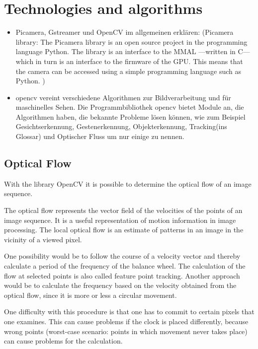 \documentclass[12pt, a4paper]{report}
\begin{document}
    \chapter{Technologies and algorithms}
    \begin{itemize}
        \item Picamera, Gstreamer und OpenCV im allgemeinen erklären:
        (Picamera library: The Picamera library is an open source project in the programming language Python. The library is an interface to the MMAL ---written in C--- which in turn is an interface to the firmware of the GPU.
    This means that the camera can be accessed using a simple programming language such as Python.  \cite{ReadTheDocsPicamera})    
        \item opencv vereint verschiedene Algorithmen zur Bildverarbeitung und für maschinelles Sehen. Die Programmbibliothek opencv bietet Module an, die Algorithmen haben, die bekannte Probleme lösen können, wie zum Beispiel Gesichtserkennung, Gestenerkennung, Objekterkennung, Tracking(ins Glossar) und Optischer Fluss um nur einige zu nennen.
  \end{itemize}
    
    \section{Optical Flow}
    With the library OpenCV it is possible to determine the optical flow of an image sequence. 
    
    The optical flow represents the vector field of the velocities of the points of an image sequence. It is a useful representation of motion information in image processing. The local optical flow is an estimate of patterns in an image in the vicinity of a viewed pixel. 
    
    One possibility would be to follow the course of a velocity vector and thereby calculate a period of the frequency of the balance wheel. The calculation of the flow at selected points is also called feature point tracking. Another approach would be to calculate the frequency based on the velocity obtained from the optical flow, since it is more or less a circular movement. 
    
    One difficulty with this procedure is that one has to commit to certain pixels that one examines. This can cause problems if the clock is placed differently, because wrong points (worst-case scenario: points in which movement never takes place) can cause problems for the calculation.  
    
\end{document}
